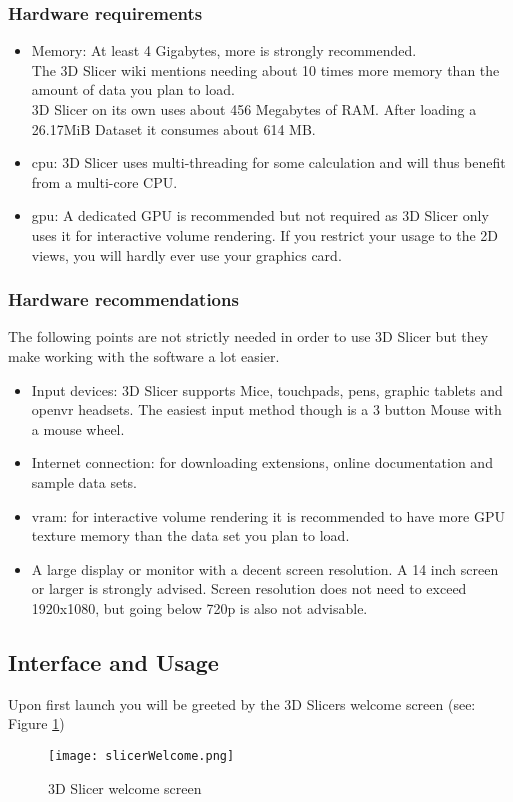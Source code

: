 \subsubsection{Hardware requirements}
\begin{itemize}
	\item Memory: At least 4 Gigabytes, more is strongly recommended.\\The 3D Slicer wiki mentions needing about 10 times more memory than the amount of data you plan to load.\\ 3D Slicer on its own uses about 456 Megabytes of RAM. After loading a 26.17MiB Dataset it consumes about 614 MB.
	\item \gls{cpu}: 3D Slicer uses multi-threading for some calculation and will thus benefit from a multi-core CPU.
	\item \gls{gpu}: A dedicated GPU is recommended but not required as 3D Slicer only uses it for interactive volume rendering. If you restrict your usage to the 2D views, you will hardly ever use your graphics card.
\end{itemize}

\subsubsection{Hardware recommendations}
The following points are not strictly needed in order to use 3D Slicer but they make working with the software a lot easier.
\begin{itemize}
	\item Input devices: 3D Slicer supports Mice, touchpads, pens, graphic tablets and \gls{openvr} headsets. The easiest input method though is a 3 button Mouse with a mouse wheel.
	\item Internet connection: for downloading extensions, online documentation and sample data sets.
	\item \gls{vram}: for interactive volume rendering it is recommended to have more GPU texture memory than the data set you plan to load.
	\item A large display or monitor with a decent screen resolution. A 14 inch screen or larger is strongly advised. Screen resolution does not need to exceed 1920x1080, but going below 720p is also not advisable.
\end{itemize}


\subsection{Interface and Usage}
Upon first launch you will be greeted by the 3D Slicers welcome screen (see: Figure \ref{fig:slicerWelcome})
\begin{figure}[h!] %
	\centerline{
		\texttt{[image: slicerWelcome.png]}}
	\caption{3D Slicer welcome screen}\label{fig:slicerWelcome}
\end{figure}

